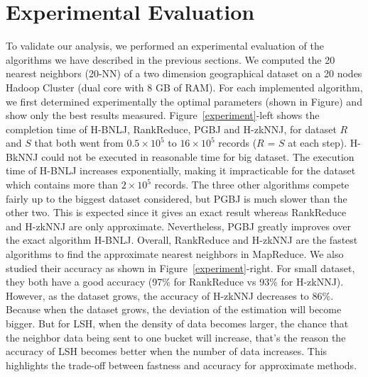 \section{Experimental Evaluation}

To validate our analysis, we performed an experimental evaluation of the algorithms we have described in the previous sections. %
We computed the 20 nearest neighbors (20-NN) of a two dimension geographical dataset on a 20 nodes Hadoop Cluster (dual core with 8 GB of RAM). For each implemented 
algorithm, we first determined experimentally the optimal parameters (shown in Figure) and show only the best results measured. 
Figure~\ref{experiment}-left shows the completion time of H-BNLJ, RankReduce, PGBJ and 
H-zkNNJ, for dataset $R$ and $S$ that both went from $0.5 \times 10^5$ to $16 \times 10^5$ records ($R$ = $S$ at each step). 
H-BkNNJ could not be executed in reasonable time for big dataset.
The execution time of H-BNLJ increases exponentially, making it impracticable for the dataset which contains more than $2 \times 10^5$ records. The 
three other algorithms compete fairly up to the biggest dataset considered, but 
PGBJ is much slower than the other two. This is expected since it gives an exact result whereas RankReduce and H-zkNNJ are only approximate. Nevertheless, PGBJ greatly improves over the exact algorithm H-BNLJ. Overall, RankReduce and H-zkNNJ are the fastest algorithms to find the approximate nearest neighbors in MapReduce. 
We also studied their accuracy as shown in Figure~\ref{experiment}-right.
For small dataset, they both have a good accuracy (97\% for RankReduce vs 93\% for  H-zkNNJ). However, as the dataset grows, the accuracy of H-zkNNJ decreases to 86\%. Because when the dataset grows, the deviation of the estimation will become bigger. But for LSH, when the density of data becomes larger, the chance that the neighbor data being sent to one bucket will increase, that's the reason the accuracy of LSH becomes better when the number of data increases.
This highlights the trade-off between fastness and accuracy for approximate methods.